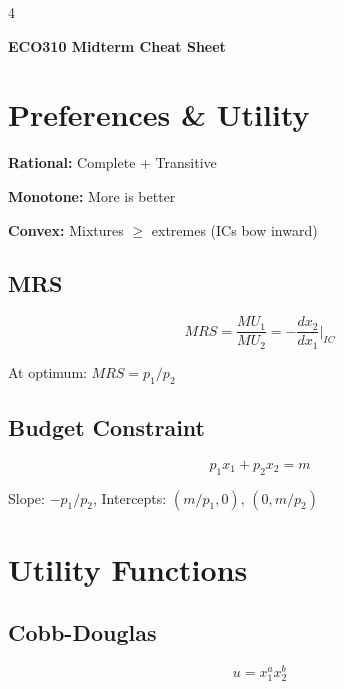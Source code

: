\documentclass[8pt,landscape]{article}
\begin{document}
\begin{multicols}{4}
\tiny

\begin{center}
\large\textbf{ECO310 Midterm Cheat Sheet}
\end{center}

\section{Preferences \& Utility}

\textbf{Rational:} Complete + Transitive

\textbf{Monotone:} More is better

\textbf{Convex:} Mixtures $\geq$ extremes (ICs bow inward)

\subsection{MRS}
$$MRS = \frac{MU_1}{MU_2} = -\frac{dx_2}{dx_1}\bigg|_{IC}$$

At optimum: $MRS = p_1/p_2$

\begin{center}
\end{center}

\subsection{Budget Constraint}
$$p_1 x_1 + p_2 x_2 = m$$

Slope: $-p_1/p_2$, Intercepts: $(m/p_1, 0)$, $(0, m/p_2)$

\section{Utility Functions}

\subsection{Cobb-Douglas}
$$u = x_1^a x_2^b$$


\end{multicols}
\end{document}
